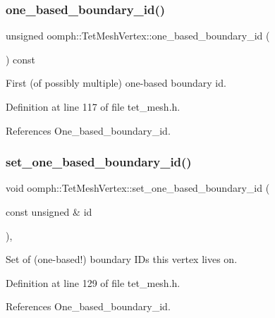 \subsubsection{\texorpdfstring{one\+\_\+based\+\_\+boundary\+\_\+id()}{one\_based\_boundary\_id()}}
{\footnotesize\ttfamily unsigned oomph\+::\+Tet\+Mesh\+Vertex\+::one\+\_\+based\+\_\+boundary\+\_\+id (\begin{DoxyParamCaption}{ }\end{DoxyParamCaption}) const\hspace{0.3cm}{\ttfamily [inline]}}



First (of possibly multiple) one-\/based boundary id. 



Definition at line 117 of file tet\+\_\+mesh.\+h.



References One\+\_\+based\+\_\+boundary\+\_\+id.

\mbox{\label{classoomph_1_1TetMeshVertex_ae228ef9cdc61d5902ac8bffdf163c618}} 
\subsubsection{\texorpdfstring{set\+\_\+one\+\_\+based\+\_\+boundary\+\_\+id()}{set\_one\_based\_boundary\_id()}}
{\footnotesize\ttfamily void oomph\+::\+Tet\+Mesh\+Vertex\+::set\+\_\+one\+\_\+based\+\_\+boundary\+\_\+id (\begin{DoxyParamCaption}\item[{const unsigned \&}]{id }\end{DoxyParamCaption})\hspace{0.3cm}{\ttfamily [inline]}, {\ttfamily [private]}}



Set of (one-\/based!) boundary I\+Ds this vertex lives on. 



Definition at line 129 of file tet\+\_\+mesh.\+h.



References One\+\_\+based\+\_\+boundary\+\_\+id.



